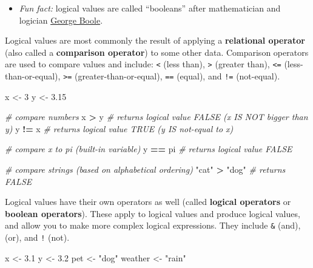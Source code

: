 \documentclass[]{book}
\newenvironment{Shaded}{\begin{snugshade}}{\end{snugshade}}
\newcommand{\DecValTok}[1]{\textcolor[rgb]{0.00,0.00,0.81}{#1}}
\newcommand{\FloatTok}[1]{\textcolor[rgb]{0.00,0.00,0.81}{#1}}
\newcommand{\StringTok}[1]{\textcolor[rgb]{0.31,0.60,0.02}{#1}}
\newcommand{\CommentTok}[1]{\textcolor[rgb]{0.56,0.35,0.01}{\textit{#1}}}
\newcommand{\OperatorTok}[1]{\textcolor[rgb]{0.81,0.36,0.00}{\textbf{#1}}}
\newcommand{\NormalTok}[1]{#1}
\providecommand{\tightlist}{%
  \setlength{\itemsep}{0pt}\setlength{\parskip}{0pt}}
\theoremstyle{definition}
\theoremstyle{definition}
\theoremstyle{remark}
\begin{document}
\begin{itemize}
  \begin{itemize}
  \tightlist
  \item
    \emph{Fun fact:} logical values are called ``booleans'' after
    mathematician and logician
    \href{https://en.wikipedia.org/wiki/George_Boole}{George Boole}.
  \end{itemize}

  Logical values are most commonly the result of applying a
  \textbf{relational operator} (also called a \textbf{comparison
  operator}) to some other data. Comparison operators are used to
  compare values and include: \texttt{\textless{}} (less than),
  \texttt{\textgreater{}} (greater than), \texttt{\textless{}=}
  (less-than-or-equal), \texttt{\textgreater{}=}
  (greater-than-or-equal), \texttt{==} (equal), and \texttt{!=}
  (not-equal).

\begin{Shaded}
\begin{Highlighting}[]
\NormalTok{x <-}\StringTok{ }\DecValTok{3}
\NormalTok{y <-}\StringTok{ }\FloatTok{3.15}

\CommentTok{# compare numbers}
\NormalTok{x }\OperatorTok{>}\StringTok{ }\NormalTok{y  }\CommentTok{# returns logical value FALSE (x IS NOT bigger than y)}
\NormalTok{y }\OperatorTok{!=}\StringTok{ }\NormalTok{x  }\CommentTok{# returns logical value TRUE (y IS not-equal to x)}

\CommentTok{# compare x to pi (built-in variable)}
\NormalTok{y }\OperatorTok{==}\StringTok{ }\NormalTok{pi  }\CommentTok{# returns logical value FALSE}

\CommentTok{# compare strings (based on alphabetical ordering)}
\StringTok{"cat"} \OperatorTok{>}\StringTok{ "dog"}  \CommentTok{# returns FALSE}
\end{Highlighting}
\end{Shaded}

  Logical values have their own operators as well (called
  \textbf{logical operators} or \textbf{boolean operators}). These apply
  to logical values and produce logical values, and allow you to make
  more complex logical expressions. They include \texttt{\&} (and),
  \texttt{\textbar{}} (or), and \texttt{!} (not).

\begin{Shaded}
\begin{Highlighting}[]
\NormalTok{x <-}\StringTok{ }\FloatTok{3.1}
\NormalTok{y <-}\StringTok{ }\FloatTok{3.2}
\NormalTok{pet <-}\StringTok{ "dog"}
\NormalTok{weather <-}\StringTok{ "rain"}


\end{Highlighting}
\end{Shaded}
\end{itemize}
\end{document}

